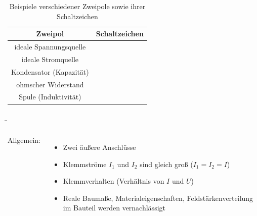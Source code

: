 \begin{frame}
{		\begin{center}
			\begin{table}[ht]
				\centering
				\begin{tabular}{|c|c|}
					\hline
					Zweipol                 & Schaltzeichen                                               \\ \hline
					ideale Spannungsquelle  &  \\ \hline
					ideale Stromquelle      &      \\ \hline
					Kondensator (Kapazität) &             \\ \hline
					ohmscher Widerstand     &     \\ \hline
					Spule (Induktivität)    &                   \\ \hline
				\end{tabular}
				\caption{Beispiele verschiedener Zweipole sowie ihrer Schaltzeichen}
				\label{tab:schaltzeichen}
			\end{table}
		\end{center}
	}
	
	\b{
	
		\begin{columns}
			
			Allgemein:\\
			\phantom{.}\\
			\begin{itemize}
				\item Zwei äußere Anschlüsse
				\item Klemmströme $I_1$ und $I_2$ sind gleich groß ($I_1=I_2 = I$)
				\item Klemmverhalten (Verhältnis von $I$ und $U$)
				\item Reale Baumaße, Materialeigenschaften, Feldstärkenverteilung im Bauteil werden vernachlässigt
			\end{itemize}
			
			
			\vspace{10pt}
			

\end{columns}}
\end{frame}
